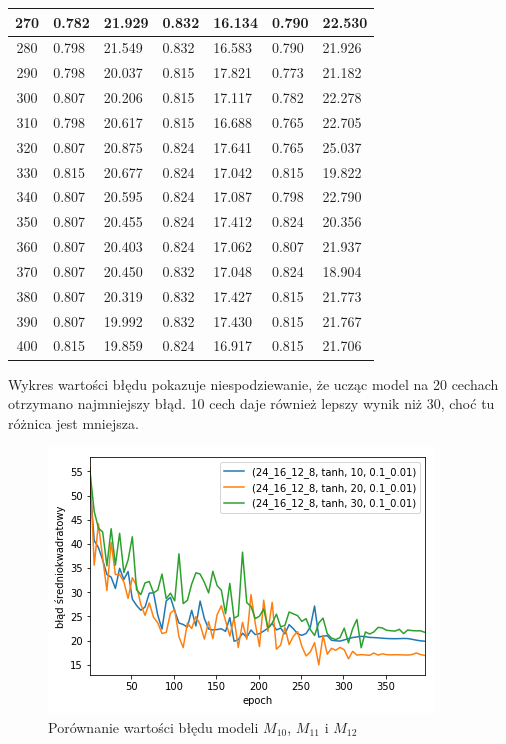 \documentclass{report}
\begin{document}
\begin{minipage}{\textwidth}
\begin{longtable}{|c|l|l|l|l|l|l|}
                     270 & 0.782 & 21.929 & 0.832 & 16.134 & 0.790 & 22.530 \\ \hline
                     280 & 0.798 & 21.549 & 0.832 & 16.583 & 0.790 & 21.926 \\ \hline
                     290 & 0.798 & 20.037 & 0.815 & 17.821 & 0.773 & 21.182 \\ \hline
                     300 & 0.807 & 20.206 & 0.815 & 17.117 & 0.782 & 22.278 \\ \hline
                     310 & 0.798 & 20.617 & 0.815 & 16.688 & 0.765 & 22.705 \\ \hline
                     320 & 0.807 & 20.875 & 0.824 & 17.641 & 0.765 & 25.037 \\ \hline
                     330 & 0.815 & 20.677 & 0.824 & 17.042 & 0.815 & 19.822 \\ \hline
                     340 & 0.807 & 20.595 & 0.824 & 17.087 & 0.798 & 22.790 \\ \hline
                     350 & 0.807 & 20.455 & 0.824 & 17.412 & 0.824 & 20.356 \\ \hline
                     360 & 0.807 & 20.403 & 0.824 & 17.062 & 0.807 & 21.937 \\ \hline
                     370 & 0.807 & 20.450 & 0.832 & 17.048 & 0.824 & 18.904 \\ \hline
                     380 & 0.807 & 20.319 & 0.832 & 17.427 & 0.815 & 21.773 \\ \hline
                     390 & 0.807 & 19.992 & 0.832 & 17.430 & 0.815 & 21.767 \\ \hline
                     400 & 0.815 & 19.859 & 0.824 & 16.917 & 0.815 & 21.706 \\ \hline
                 \end{longtable}
    \end{minipage}

    Wykres wartości błędu pokazuje niespodziewanie, że ucząc model na 20 cechach otrzymano najmniejszy błąd.
    10 cech daje również lepszy wynik niż 30, choć tu różnica jest mniejsza.

    \begin{figure}[htp]
        \centering
        \includegraphics[scale=0.8]{./img/feat-error-tanh.png}
        \caption{Porównanie wartości błędu modeli $M_{10}$, $M_{11}$ i $M_{12}$}
    \end{figure}
\end{document}
